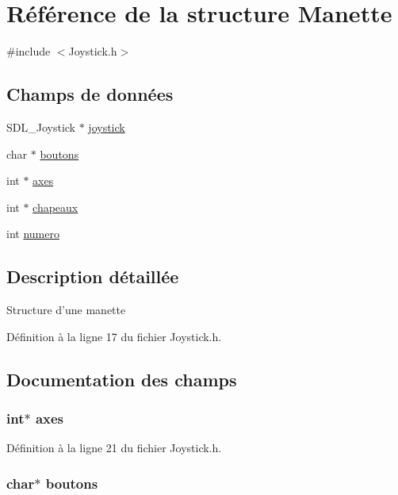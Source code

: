 \hypertarget{struct_manette}{\section{Référence de la structure Manette}
\label{struct_manette}
}


{\ttfamily \#include $<$Joystick.\-h$>$}

\subsection*{Champs de données}
\begin{DoxyCompactItemize}
\item 
S\-D\-L\-\_\-\-Joystick $\ast$ \hyperlink{struct_manette_a5fe6c6b426f70a21df07c64227b2c337}{joystick}
\item 
char $\ast$ \hyperlink{struct_manette_a2d5d3e36cd5f3cfc05dfc548b3ad6f85}{boutons}
\item 
int $\ast$ \hyperlink{struct_manette_ae2fe71f7c5edeaa9fc2676be4a93499a}{axes}
\item 
int $\ast$ \hyperlink{struct_manette_abe08f36c0a251e0a68bd59d121d468c5}{chapeaux}
\item 
int \hyperlink{struct_manette_a2c30f43104974e72e2809fb4569804b0}{numero}
\end{DoxyCompactItemize}


\subsection{Description détaillée}
Structure d'une manette 

Définition à la ligne 17 du fichier Joystick.\-h.



\subsection{Documentation des champs}
\hypertarget{struct_manette_ae2fe71f7c5edeaa9fc2676be4a93499a}{
\subsubsection[{axes}]{\setlength{\rightskip}{0pt plus 5cm}int$\ast$ axes}}\label{struct_manette_ae2fe71f7c5edeaa9fc2676be4a93499a}


Définition à la ligne 21 du fichier Joystick.\-h.

\hypertarget{struct_manette_a2d5d3e36cd5f3cfc05dfc548b3ad6f85}{
\subsubsection[{boutons}]{\setlength{\rightskip}{0pt plus 5cm}char$\ast$ boutons}}\label{struct_manette_a2d5d3e36cd5f3cfc05dfc548b3ad6f85}


